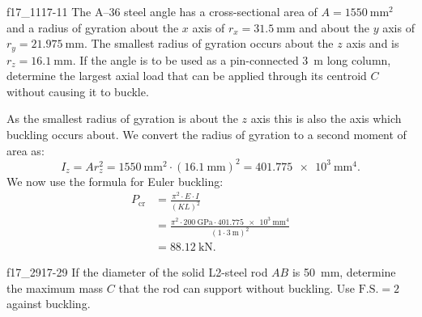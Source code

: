 
\begin{problemwithimage}{f17_11}{17-11}
  The A--36 steel angle has a cross-sectional area of $A = \qty{1550}{\mm^2}$ and a radius of gyration about the $x$ axis of $r_x = \qty{31,5}{\mm}$ and about the $y$ axis of $r_y = \qty{21,975}{\mm}$.
  The smallest radius of gyration occurs about the $z$ axis and is $r_z = \qty{16,1}{\mm}$.
  If the angle is to be used as a pin-connected \qty{3}{\m} long column, determine the largest axial load that can be applied through its centroid $C$ without causing it to buckle.
\end{problemwithimage}

\begin{derivation}
  As the smallest radius of gyration is about the $z$ axis this is also the axis which buckling occurs about.
  We convert the radius of gyration to a second moment of area as:
  \begin{equation*}
    I_z = A r_z^2 = \qty{1550}{\mm^2} \cdot \left( \qty{16.1}{\mm}  \right)^2 = \qty{401,775e3}{\mm^4}
  .\end{equation*}
  We now use the formula for Euler buckling:
  \begin{align*}
    P_{\mathrm{cr}} &= \frac{\pi^2 \cdot E \cdot I}{\left( KL \right)^2}\\
    &= \frac{\pi^2 \cdot \qty{200}{\GPa} \cdot \qty{401,775e3}{\mm^{4}} }{\left( 1 \cdot \qty{3}{\m}  \right)^2} \\
    &= \qty{88,12}{\kN} 
  .\end{align*}
\end{derivation}


\begin{problemwithimage}{f17_29}{17-29}
  If the diameter of the solid L2-steel rod $AB$ is \qty{50}{\mm}, determine the maximum mass $C$ that the rod can support without buckling.
  Use $\mathrm{F.S.} = 2$ against buckling.
\end{problemwithimage}

